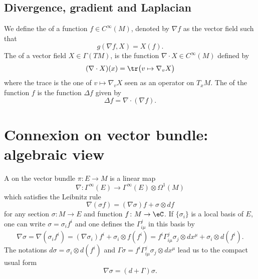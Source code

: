 \subsection{Divergence, gradient and Laplacian}

We define the  of a function $f\in C^{\infty}(M)$, denoted by $\nabla f$ as the vector field such that
\begin{equation}
	g(\nabla f,X)=X(f).
\end{equation}
The  of a vector field $X\in \Gamma(TM)$, is the function $\nabla\cdot X\in C^{\infty}(M)$ defined by
\begin{equation}
  (\nabla\cdot X)(x)=\tr\big( v\mapsto\nabla_vX \big)
\end{equation}
where the trace is the one of $v\mapsto\nabla_vX$ seen as an operator on $T_xM$. The  of the function $f$ is the function $\Delta f$ given by
\begin{equation}
\Delta f=\nabla\cdot(\nabla f).
\end{equation}

\section{Connexion on vector bundle: algebraic view}

A  on the vector bundle $\pi\colon E\to M$ is a linear map
\[ 
  \nabla\colon \Gamma^{\infty}(E)\to \Gamma^{\infty}(E)\otimes\Omega^1(M)
\]
which satisfies the Leibnitz rule
\begin{equation}
\nabla(\sigma f)=(\nabla\sigma)f+\sigma\otimes df
\end{equation}
for any section $\sigma\colon M\to E$ and function $f\colon M\to \eC$. If $\{ \sigma_i \}$ is a local basis of $E$, one can write $\sigma=\sigma_if^i$ and one defines the  $\Gamma_{i\mu}^{j}$ in this basis by
\begin{equation}
\nabla \sigma=\nabla (\sigma_if^i)
		=(\nabla \sigma_i)f^i+\sigma_i\otimes f(f^i)
		=f^i\Gamma_{i\mu}^{j}\sigma_j\otimes dx^{\mu}+\sigma_i\otimes d(f^i).
\end{equation}
The notations $d\sigma=\sigma_i\otimes d(f^i)$ and $\Gamma\sigma=f^i\Gamma_{i\mu}^{j}\sigma_j\otimes dx^{\mu}$ lead us to the compact usual form
\[ 
  \nabla\sigma=(d+\Gamma)\sigma.
\]

